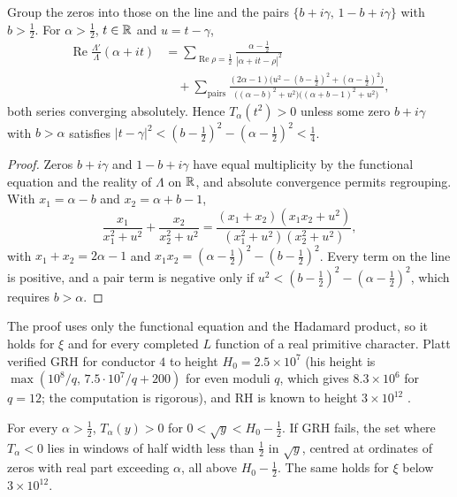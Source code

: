 \begin{theorem}\label{beta:thm:local}
Group the zeros into those on the line and the pairs $\{b+i\gamma,\,1-b+i\gamma\}$ with $b>\tfrac12$. For $\alpha>\tfrac12$, $t\in\mathbb{R}$ and $u=t-\gamma$,
\begin{equation}\label{beta:eq:pair}
\begin{split}
\operatorname{Re}\frac{\Lambda'}{\Lambda}(\alpha+it)&=\sum_{\operatorname{Re}\rho=\frac12}\frac{\alpha-\frac12}{|\alpha+it-\rho|^2}\\
&\quad+\sum_{\text{pairs}}\frac{(2\alpha-1)\bigl(u^2-(b-\frac12)^2+(\alpha-\frac12)^2\bigr)}{\bigl((\alpha-b)^2+u^2\bigr)\bigl((\alpha+b-1)^2+u^2\bigr)},
\end{split}
\end{equation}
both series converging absolutely. Hence $T_\alpha(t^2)>0$ unless some zero $b+i\gamma$ with $b>\alpha$ satisfies $|t-\gamma|^2<(b-\tfrac12)^2-(\alpha-\tfrac12)^2<\tfrac14$.
\end{theorem}

\begin{proof}
Zeros $b+i\gamma$ and $1-b+i\gamma$ have equal multiplicity by the functional equation and the reality of $\Lambda$ on $\mathbb{R}$, and absolute convergence permits regrouping. With $x_1=\alpha-b$ and $x_2=\alpha+b-1$,
\[
\frac{x_1}{x_1^2+u^2}+\frac{x_2}{x_2^2+u^2}=\frac{(x_1+x_2)(x_1x_2+u^2)}{(x_1^2+u^2)(x_2^2+u^2)},
\]
with $x_1+x_2=2\alpha-1$ and $x_1x_2=(\alpha-\tfrac12)^2-(b-\tfrac12)^2$. Every term on the line is positive, and a pair term is negative only if $u^2<(b-\tfrac12)^2-(\alpha-\tfrac12)^2$, which requires $b>\alpha$.
\end{proof}

The proof uses only the functional equation and the Hadamard product, so it holds for $\xi$ and for every completed $L$ function of a real primitive character. Platt \cite{platt2016} verified GRH for conductor $4$ to height $H_0=2.5\times10^7$ (his height is $\max(10^8/q,\,7.5\cdot10^7/q+200)$ for even moduli $q$, which gives $8.3\times10^6$ for $q=12$; the computation is rigorous), and RH is known to height $3\times10^{12}$ \cite{platttrudgian2021}.

\begin{corollary}\label{beta:cor:height}
For every $\alpha>\tfrac12$, $T_\alpha(y)>0$ for $0<\sqrt y<H_0-\tfrac12$. If GRH fails, the set where $T_\alpha<0$ lies in windows of half width less than $\tfrac12$ in $\sqrt y$, centred at ordinates of zeros with real part exceeding $\alpha$, all above $H_0-\tfrac12$. The same holds for $\xi$ below $3\times10^{12}$.
\end{corollary}

